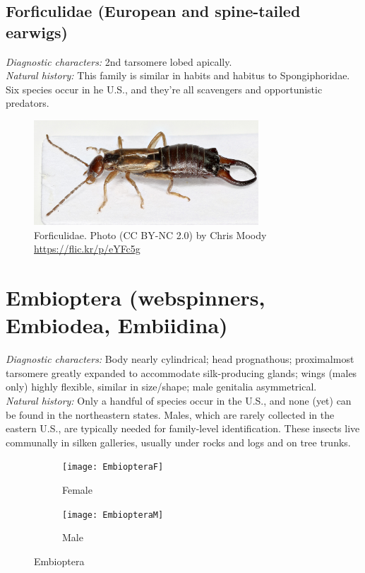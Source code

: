 \documentclass[letterpaper, 11pt]{article}
\begin{document}
\subsection{Forficulidae (European and spine-tailed earwigs)}
\noindent{}\textit{Diagnostic characters:} 2nd tarsomere lobed apically.\\

\noindent{}\textit{Natural history:} This family is similar in habits and habitus to Spongiphoridae. Six species occur in he U.S., and they're all scavengers and opportunistic predators. \\

\begin{figure}[ht!]
  \centering
    \includegraphics[width=0.75\textwidth]{forfic1}
  \caption{Forficulidae. Photo (CC BY-NC 2.0) by Chris Moody \url{https://flic.kr/p/eYFc5g}}
  \label{fig:forfic1}
\end{figure}

\section{Embioptera (webspinners, Embiodea, Embiidina)}
\noindent{}\textit{Diagnostic characters:} Body nearly cylindrical; head prognathous; proximalmost tarsomere greatly expanded to accommodate silk-producing glands;  wings (males only) highly flexible, similar in size/shape; male genitalia asymmetrical.\\

\noindent{}\textit{Natural history:} Only a handful of species occur in the U.S., and none (yet) can be found in the northeastern states. Males, which are rarely collected in the eastern U.S., are typically needed for family-level identification. These insects live communally in silken galleries, usually under rocks and logs and on tree trunks.\\

\begin{figure}[ht!]
    \centering
    \begin{subfigure}[b!]{0.45\textwidth}
        \texttt{[image: EmbiopteraF]}
        \caption{Female \citep[modified from][Plate 1, Fig. D]{bhl37580}}
        \label{fig:embiop1}
    \end{subfigure}
    \qquad
    \begin{subfigure}[ht!]{0.4\textwidth}
        \texttt{[image: EmbiopteraM]}
        \caption{Male \citep[modified from][Plate 130, Fig. C]{bhl37580}}
        \label{fig:embiop2}
    \end{subfigure}
    \caption{Embioptera}\label{fig:embiops}
\end{figure}
\end{document}
